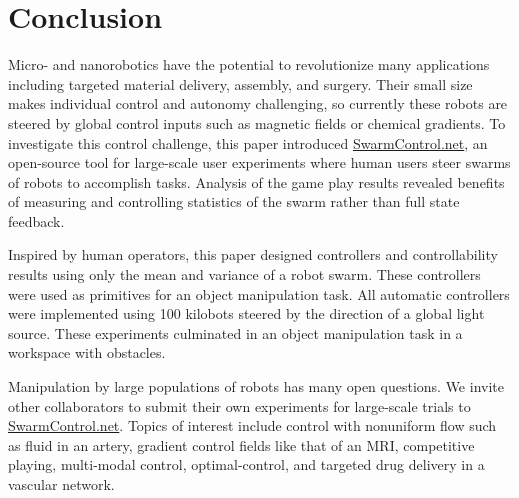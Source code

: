 \section{Conclusion}\label{sec:conclusion}
 
    Micro- and nanorobotics have the potential to revolutionize many applications including targeted material delivery, assembly, and surgery.  Their small size makes individual control and autonomy challenging, so currently these robots are steered by global control inputs such as magnetic fields or chemical gradients. To investigate this control challenge, this paper introduced \href{http://www.swarmcontrol.net}{SwarmControl.net}, an open-source tool for large-scale user experiments where human users steer swarms of robots to accomplish tasks.  Analysis of the game play results revealed benefits of measuring and controlling statistics of the swarm rather than full state feedback.

Inspired by human operators, this paper designed controllers and controllability results using only the mean and variance of a robot swarm. 
These controllers were used as primitives for an object manipulation task.
All automatic controllers were implemented using 100 kilobots steered by the direction of a global light source.
These experiments culminated in an object manipulation task in a workspace with obstacles.
    
  Manipulation by large populations of robots has many open questions. We invite other collaborators to submit their own experiments for large-scale trials to \href{http://www.swarmcontrol.net}{SwarmControl.net}.
Topics of interest include control with nonuniform flow such as fluid in an artery, gradient control fields like that of an MRI, competitive playing, multi-modal control, optimal-control, and targeted drug delivery in a vascular network. 


